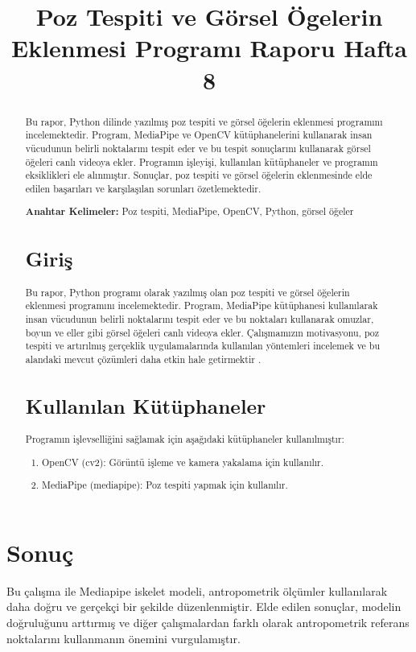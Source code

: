 \documentclass[12pt, a4paper]{article}
\begin{document}
\section{Sonuç}
Bu çalışma ile Mediapipe iskelet modeli, antropometrik ölçümler kullanılarak daha doğru ve gerçekçi bir şekilde düzenlenmiştir. Elde edilen sonuçlar, modelin doğruluğunu arttırmış ve diğer çalışmalardan farklı olarak antropometrik referans noktalarını kullanmanın önemini vurgulamıştır.
\title{Poz Tespiti ve Görsel Ögelerin Eklenmesi 
	Programı Raporu Hafta 8}
\author{}
\date{}
\maketitle
\setcounter{section}{0}
 \begin{abstract}
	\begin{justify}
	Bu rapor, Python dilinde yazılmış poz tespiti ve görsel öğelerin eklenmesi programını incelemektedir. Program, MediaPipe ve OpenCV kütüphanelerini kullanarak insan vücudunun belirli noktalarını tespit eder ve bu tespit sonuçlarını kullanarak görsel öğeleri canlı videoya ekler. Programın işleyişi, kullanılan kütüphaneler ve programın eksiklikleri ele alınmıştır. Sonuçlar, poz tespiti ve görsel öğelerin eklenmesinde elde edilen başarıları ve karşılaşılan sorunları özetlemektedir.
	\end{justify}
	\textbf{Anahtar Kelimeler:}  Poz tespiti, MediaPipe, OpenCV, Python, görsel öğeler
	\section{Giriş}
	Bu rapor, Python programı olarak yazılmış olan poz tespiti ve görsel öğelerin eklenmesi programını incelemektedir. Program, MediaPipe kütüphanesi kullanılarak insan vücudunun belirli noktalarını tespit eder ve bu noktaları kullanarak omuzlar, boyun ve eller gibi görsel öğeleri canlı videoya ekler. Çalışmamızın motivasyonu, poz tespiti ve artırılmış gerçeklik uygulamalarında kullanılan yöntemleri incelemek ve bu alandaki mevcut çözümleri daha etkin hale getirmektir \cite{MediapipeGithubb}.
	\section{Kullanılan Kütüphaneler}
	Programın işlevselliğini sağlamak için aşağıdaki kütüphaneler kullanılmıştır:
	\begin{enumerate}
     \item 	OpenCV (cv2): Görüntü işleme ve kamera yakalama için kullanılır.
	 \item MediaPipe (mediapipe): Poz tespiti yapmak için kullanılır.
		

\end{enumerate}
\end{abstract}
\end{document}
